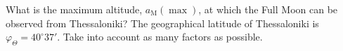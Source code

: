 What is the maximum altitude, $a_{\mathrm{M}}(\max)$, at which the Full Moon
can be observed from Thessaloniki? The geographical latitude of Thessaloniki
is $\varphi_\Theta = 40^\circ 37'$. Take into account as many factors as
possible.
